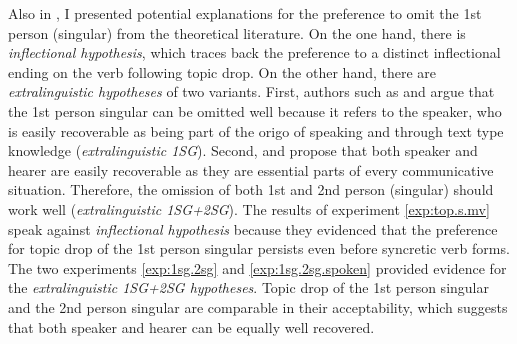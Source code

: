 Also in , I presented potential explanations for the preference to omit the 1st person (singular) from the theoretical literature.
On the one hand, there is  \textit{inflectional hypothesis}, which traces back the preference to a distinct inflectional ending  on the verb following topic drop.
On the other hand, there are \textit{extralinguistic hypotheses} of two variants.
First, authors such as \citet{imo2014} and \citet{volodina.onea2012} argue that the 1st person singular can be omitted well because it refers to the speaker, who is easily recoverable  as being part of the origo of speaking and through text type knowledge (\textit{extralinguistic 1SG}).
Second, \citet{zifonun.etal1997} and \citet{ariel1990} propose that both speaker and hearer are easily recoverable  as they are essential parts of every communicative situation.
Therefore, the omission of both 1st and 2nd person (singular) should work well (\textit{extralinguistic 1SG+2SG}).
The results of experiment \ref*{exp:top.s.mv} speak against  \textit{inflectional hypothesis} because they evidenced that the preference for topic drop of the 1st person singular persists even before syncretic  verb forms.
The two experiments \ref*{exp:1sg.2sg} and \ref*{exp:1sg.2sg.spoken} provided evidence for the \textit{extralinguistic 1SG+2SG hypotheses}.
Topic drop of the 1st person singular and the 2nd person singular are comparable in their acceptability, which suggests that both speaker and hearer can be equally well recovered. 

